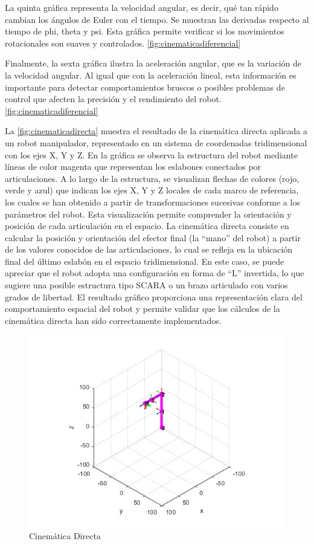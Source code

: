 La quinta gráfica representa la velocidad angular, es decir, qué tan rápido cambian los ángulos de Euler con el tiempo. Se muestran las derivadas respecto al tiempo de phi, theta y psi. Esta gráfica permite verificar si los movimientos rotacionales son suaves y controlados. \autoref{fig:cinematicadiferencial}

Finalmente, la sexta gráfica ilustra la aceleración angular, que es la variación de la velocidad angular. Al igual que con la aceleración lineal, esta información es importante para detectar comportamientos bruscos o posibles problemas de control que afecten la precisión y el rendimiento del robot. \autoref{fig:cinematicadiferencial}

La \autoref{fig:cinematicadirecta}  muestra el resultado de la cinemática directa aplicada a un robot manipulador, representado en un sistema de coordenadas tridimensional con los ejes X, Y y Z. En la gráfica se observa la estructura del robot mediante líneas de color magenta que representan los eslabones conectados por articulaciones. A lo largo de la estructura, se visualizan flechas de colores (rojo, verde y azul) que indican los ejes X, Y y Z locales de cada marco de referencia, los cuales se han obtenido a partir de transformaciones sucesivas conforme a los parámetros del robot. Esta visualización permite comprender la orientación y posición de cada articulación en el espacio. La cinemática directa consiste en calcular la posición y orientación del efector final (la “mano” del robot) a partir de los valores conocidos de las articulaciones, lo cual se refleja en la ubicación final del último eslabón en el espacio tridimensional. En este caso, se puede apreciar que el robot adopta una configuración en forma de “L” invertida, lo que sugiere una posible estructura tipo SCARA o un brazo articulado con varios grados de libertad. El resultado gráfico proporciona una representación clara del comportamiento espacial del robot y permite validar que los cálculos de la cinemática directa han sido correctamente implementados.

\begin{figure}
	\centering
	\includegraphics[width=0.5\linewidth]{img/cinematicadirecta}
	\caption{Cinemática Directa}
	\label{fig:cinematicadirecta}
\end{figure}

